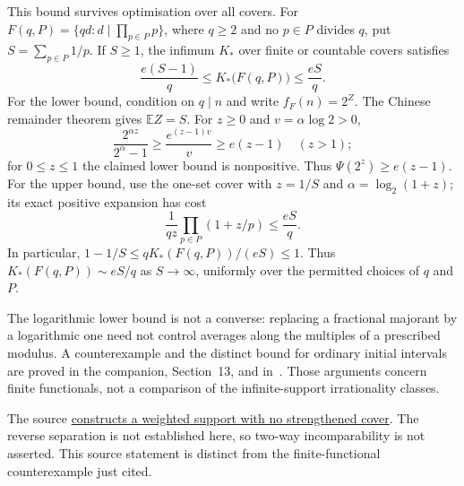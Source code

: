 \documentclass[11pt]{article}
\begin{document}
This bound survives optimisation over all covers.  For
$F(q,P)=\{qd:d\mid\prod_{p\in P}p\}$, where $q\ge2$ and no $p\in P$
divides $q$, put $S=\sum_{p\in P}1/p$.  If $S\ge1$, the infimum $K_*$
over finite or countable covers satisfies
\begin{equation}
 \frac{e(S-1)}q\le K_*\bigl(F(q,P)\bigr)\le\frac{eS}q.
 \label{eq:optimal-cube-cost}
\end{equation}
For the lower bound, condition on $q\mid n$ and write
$f_F(n)=2^Z$.  The Chinese remainder theorem gives
$\mathbb EZ=S$.  For $z\ge0$ and $v=\alpha\log2>0$,
\[
 \frac{2^{\alpha z}}{2^\alpha-1}
 \ge\frac{e^{(z-1)v}}v\ge e(z-1)\quad(z>1);
\]
for $0\le z\le1$ the claimed lower bound is nonpositive.
Thus $\Psi(2^z)\ge e(z-1)$.  For the upper bound, use the
one-set cover with $z=1/S$ and $\alpha=\log_2(1+z)$; its exact
positive expansion has cost
\[
 \frac1{qz}\prod_{p\in P}(1+z/p)\le\frac{eS}q.
\]
In particular,
$1-1/S\le qK_*(F(q,P))/(eS)\le1$.
Thus $K_*(F(q,P))\sim eS/q$ as $S\to\infty$, uniformly over the
permitted choices of $q$ and $P$.

The logarithmic lower bound is not a converse: replacing a fractional
majorant by a logarithmic one need not control averages along the
multiples of a prescribed modulus.  A counterexample and the distinct
bound for ordinary initial intervals are proved in the companion,
Section~13, and in~\cite[Theorem~1, Corollary~3 and
Proposition~4]{endpoint2026}.  Those arguments concern finite
functionals, not a comparison of the infinite-support irrationality
classes.

The source
\href{https://github.com/wcook04/plectis-erdos-lean/blob/52f29ad173b04e3bac941b3663f2b9aebe5de0bb/ErdosProblems/Erdos257/PaperCompleteR8/AnalyticSeparationReturn.lean#L16}{constructs a weighted support with no strengthened cover}.
The reverse separation is not established here, so two-way
incomparability is not asserted.  This source statement is distinct
from the finite-functional counterexample just cited.
\end{document}
